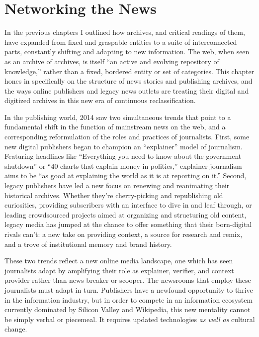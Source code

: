 \chapter{Networking the News}

In the previous chapters I outlined how archives, and critical readings of them, have expanded from fixed and graspable entities to a suite of interconnected parts, constantly shifting and adapting to new information. The web, when seen as an archive of archives, is itself ``an active and evolving repository of knowledge,'' rather than a fixed, bordered entity or set of categories.\autocite[2]{chakrabarti_mining_2003} This chapter hones in specifically on the structure of news stories and publishing archives, and the ways online publishers and legacy news outlets are treating their digital and digitized archives in this new era of continuous reclassification.


In the publishing world, 2014 saw two simultaneous trends that point to a fundamental shift in the function of mainstream news on the web, and a corresponding reformulation of the roles and practices of journalists. First, some new digital publishers began to champion an ``explainer'' model of journalism. Featuring headlines like ``Everything you need to know about the government shutdown'' or ``40 charts that explain money in politics,'' explainer journalism aims to be ``as good at explaining the world as it is at reporting on it.''\autocite{klein_vox_2014} Second, legacy publishers have led a new focus on renewing and reanimating their historical archives. Whether they're cherry-picking and republishing old curiosities, providing subscribers with an interface to dive in and leaf through, or leading crowdsourced projects aimed at organizing and structuring old content, legacy media has jumped at the chance to offer something that their born-digital rivals can't: a new take on providing context, a source for research and remix, and a trove of institutional memory and brand history.

These two trends reflect a new online media landscape, one which has seen journalists adapt by amplifying their role as explainer, verifier, and context provider rather than news breaker or scooper. The newsrooms that employ these journalists must adapt in turn. Publishers have a newfound opportunity to thrive in the information industry, but in order to compete in an information ecosystem currently dominated by Silicon Valley and Wikipedia, this new mentality cannot be simply verbal or piecemeal. It requires updated technologies \emph{as well as} cultural change.

